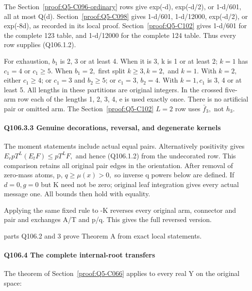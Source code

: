 The Section~\ref{proof:Q5-C096-ordinary} rows give exp(-d), exp(-d/2), or 1-d/601, all at most Q(d).
Section~\ref{proof:Q5-C098} gives 1-d/601, 1-d/12000, exp(-d/2), or exp(-8d), as recorded
in its local proof. Section~\ref{proof:Q5-C102} gives 1-d/601 for the complete 123 table,
and 1-d/12000 for the complete 124 table. Thus every row supplies (Q106.1.2).

For exhaustion, \(b_1\) is 2, 3 or at least 4. When it is 3, k is 1 or
at least 2; \(k=1\) has \(c_1=4\) or \(c_1\ge 5.\) When \(b_1=2,\allowbreak \) first split \(k\ge 3,\allowbreak  k=2,\allowbreak \) and \(k=1.\) With \(k=2,\allowbreak \) either \(c_1\ge 4\); or \(c_1=3\) and \(b_2\ge 5\); or
\(c_1=3\), \(b_2=4\). With \(k=1,\allowbreak  c_1\) is 3, 4 or at least 5. All lengths in
these partitions are original integers. In the crossed five-arm row
each of the lengths 1, 2, 3, 4, e is used exactly once. There is no artificial
pair or omitted arm. The Section~\ref{proof:Q5-C102} \(L=2\) row uses \(\bar f_3,\allowbreak \) not \(h_3.\)

\paragraph{Q106.3.3 Genuine decorations, reversal, and degenerate kernels}

The moment statements include actual equal pairs. Alternatively
positivity gives \(E_rpT^L(E_tF)\le pT^LF,\allowbreak \) and hence (Q106.1.2) from the undecorated
row. This comparison retains all original pair edges in the orientation.
After removal of zero-mass atoms, p, \(q\ge \mu(x)>0,\allowbreak \) so inverse q powers below
are defined. If \(d=0,\allowbreak  g=0\) but K need not be zero; original leaf integration
gives every actual message one. All bounds then hold with equality.

Applying the same fixed rule to -K reverses every original arm, connector
and pair and exchanges A/T and p/q. This gives the full reversed version.


parts Q106.2 and 3 prove Theorem A from exact local statements.

\paragraph{Q106.4 The complete internal-root transfers}

The theorem of Section~\ref{proof:Q5-C066} applies to every real Y on the original space:


